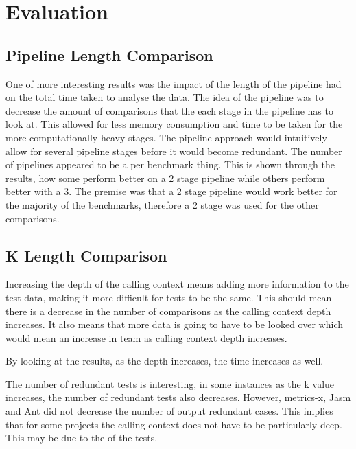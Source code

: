 \chapter{Evaluation}\label{C:evaluation}

\section{Pipeline Length Comparison}

One of more interesting results was the impact of the length of the pipeline had on the total time taken to analyse the data. The idea of the pipeline was to decrease the amount of comparisons that the each stage in the pipeline has to look at. This allowed for less memory consumption and time to be taken for the more computationally heavy stages. The pipeline approach would intuitively allow for several pipeline stages before it would become redundant. The number of pipelines appeared to be a per benchmark thing. This is shown through the results, how some perform better on a 2 stage pipeline while others perform better with a 3. The premise was that a 2 stage pipeline would work better for the majority of the benchmarks, therefore a 2 stage was used for the other comparisons. 


\section{K Length Comparison}

Increasing the depth of the calling context means adding more information to the test data, making it more difficult for tests to be the same. This should mean there is a decrease in the number of comparisons as the calling context depth increases. It also means that more data is going to have to be looked over which would mean an increase in team as calling context depth increases.

By looking at the results, as the depth increases, the time increases as well. 

The number of redundant tests is interesting, in some instances as the k value increases, the number of redundant tests also decreases. However, metrics-x, Jasm and Ant did not decrease the number of output redundant cases. This implies that for some projects the calling context does not have to be particularly deep. This may be due to the  of the tests.



